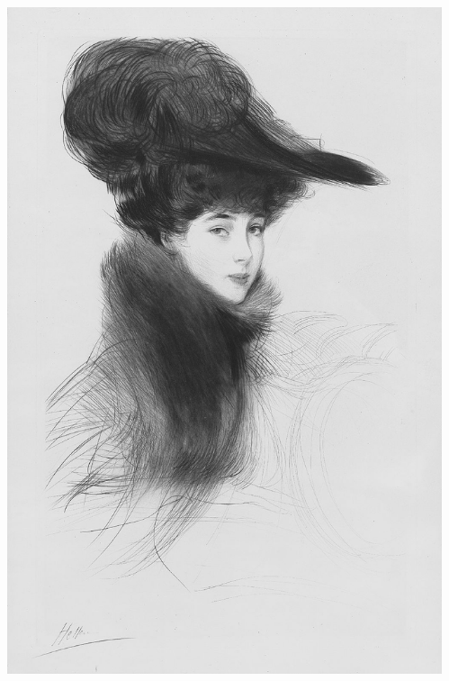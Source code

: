 \documentclass[aspectratio=169]{beamer}
\theoremstyle{principle}
\begin{document}
\begin{frame}
\begin{columns}
\begin{column}{0.5\textwidth}
\end{column}
\begin{column}{0.5\textwidth}
\includegraphics[scale=0.15]{vanderbilt.jpg}
\end{column}
\end{columns}

\end{frame}
\end{document}
